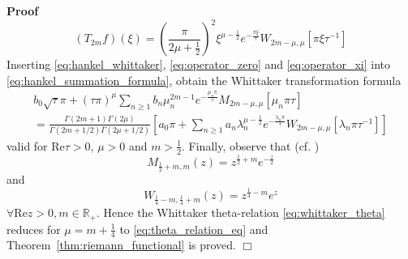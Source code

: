 \documentclass{article}
\newenvironment{proof}{\noindent\textbf{Proof\ }}{\hspace*{\fill}$\Box$\medskip}
\begin{document}
\begin{proof}
  \begin{equation}
    (T_{2 m} f) (\xi) = \left( \frac{\pi}{2 \mu + \frac{1}{2}} \right)^2
    \xi^{\mu - \frac{1}{2}} e^{- \frac{\pi \xi}{\tau}} W_{2 m - \mu, \mu} 
    [\pi \xi \tau^{- 1}] \label{eq:operator_xi}
  \end{equation}
  Inserting \eqref{eq:hankel_whittaker}, \eqref{eq:operator_zero} and
  \eqref{eq:operator_xi} into \eqref{eq:hankel_summation_formula}, obtain the
  Whittaker transformation formula
  \begin{equation}
    \begin{array}{l}
      b_0  \sqrt{\tau} \pi + (\tau \pi)^{\mu}  \sum_{n \geq 1} b_n \mu_n^{2 m
      - 1} e^{- \frac{\mu_n \pi}{\tau}} M_{2 m - \mu, \mu}  [\mu_n \pi \tau]\\
      = \frac{\Gamma (2 m + 1) \Gamma (2 \mu)}{\Gamma (2 m + 1 / 2) \Gamma (2
      \mu + 1 / 2)}  \left[ a_0 \pi + \sum_{n \geq 1} a_n \lambda_n^{\mu -
      \frac{1}{2}} e^{- \frac{\lambda_n \pi}{\tau}} W_{2 m - \mu, \mu}
      [\lambda_n \pi \tau^{- 1}] \right] \label{eq:whittaker_theta}
    \end{array}
  \end{equation}
  valid for $\mathrm{Re} \tau > 0$, $\mu > 0$ and $m > \frac{1}{2}$. Finally,
  observe that (cf. {\cite{16}})
  \begin{equation}
    M_{\frac{1}{2} + m, m} (z) = z^{\frac{1}{2} + m} e^{- \frac{z}{2}}
    \label{eq:whittaker_special}
  \end{equation}
  and
  \begin{equation}
    W_{\frac{1}{4} - m, \frac{1}{4} + m} (z) = z^{\frac{1}{4} - m} e^z
  \end{equation}
  $\forall \mathrm{Re} z > 0, m \in \mathbb{R}_+ .$ Hence the Whittaker
  theta-relation \eqref{eq:whittaker_theta} reduces for $\mu = m +
  \frac{1}{4}$ to \eqref{eq:theta_relation_eq} and
  Theorem~\ref{thm:riemann_functional} is proved.
\end{proof}
\end{document}
